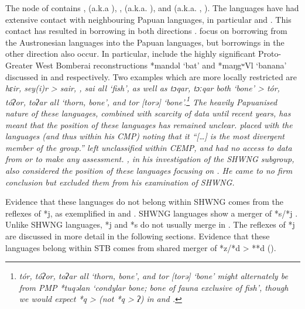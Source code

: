The  node of  contains
,  (a.k.a ), ,  (a.k.a.
), and  (a.k.a. , ).
The  languages have had extensive contact
with neighbouring Papuan languages,
in particular  and .
This contact has resulted in borrowing in both directions
\citep{UsherSchapper2018,UsherSchapper2022}.
\citet{UsherSchapper2018} focus on borrowing from the Austronesian
languages into the Papuan languages,
but borrowings in the other direction also occur.
In particular, \citet{UsherSchapper2022} include the highly significant
Proto-Greater West Bomberai reconstructions *mandəl ‘bat’
and *maŋgʷVl ‘banana’ discussed in
 and  respectively.
Two examples which are more locally restricted are  \it{hɛir},
 \it{sey(i)r} >  \it{sair},
,  \it{sai} all ‘fish’,
as well as  \it{tɔqar},
 \it{tɔːqar} both ‘bone’ >  \it{tór},
 \it{tóʔor},  \it{toʔar} all ‘thorn,
bone’, and  \it{tor} [torə] ‘bone’.\footnote{
		 \it{tór},
		 \it{tóʔor},  \it{toʔar} all ‘thorn,
		bone’, and  \it{tor} [torə] ‘bone’ might alternately be
		from PMP *tuqəlan ‘condylar bone; bone of fauna exclusive of
		fish’, though we would expect *q > {\0} (not *q > \it{ʔ}) in 
		and .} 
The heavily Papuanised nature of these languages,
combined with scarcity of data until recent years,
has meant that the position of these languages has remained unclear.
\citet[272]{Blust1993} placed  with the 
languages (and thus within his CMP) noting that it “[{\ldots}]
is the most divergent member of the group.” \citet{Blust1993}
left  unclassified within CEMP,
and had no access to data from  or  to make any assessment.
\citet{Kamholz2014}, in his investigation of the SHWNG subgroup,
also considered the position of these languages focusing on .
He came to no firm conclusion but excluded them from his examination of SHWNG.

\largerpage
Evidence that these languages do not belong within SHWNG comes
from the reflexes of *j,
as exemplified in  and .
SHWNG languages show a merger of *s/*j \citep[52f]{Kamholz2014}.
Unlike SHWNG languages, *j
and *s do not usually merge in .
The reflexes of *j are discussed in more detail in the following sections.
Evidence that these languages belong within STB comes from shared
merger of *z/*d > **d ().

